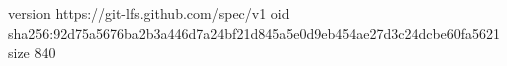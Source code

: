 version https://git-lfs.github.com/spec/v1
oid sha256:92d75a5676ba2b3a446d7a24bf21d845a5e0d9eb454ae27d3c24dcbe60fa5621
size 840
